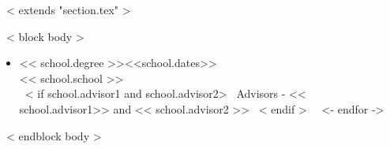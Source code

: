 ~< extends "section.tex" >~

~< block body >~
\begin{itemize}
~<- for school in items ->~
     \item << school.degree >>\hfill <<school.dates>> \\
     << school.school >> \\
 ~< if school.advisor1 and school.advisor2>~
   Advisors - << school.advisor1>> and << school.advisor2 >>
  ~< endif >~
  ~<- endfor ->~
\end{itemize}
~< endblock body >~

